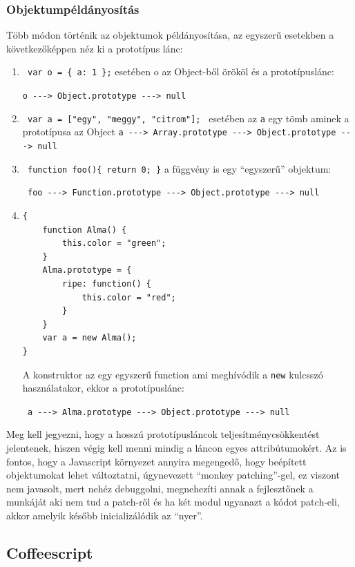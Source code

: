 \subsubsection{Objektumpéldányosítás}

Több módon történik az objektumok példányosítása, az egyszerű esetekben a következőképpen néz ki a prototípus lánc: 
\begin{enumerate}
\item \lstinline| var o = { a: 1 };| esetében o az Object-ből örököl és a prototípuslánc:

 \lstinline|o ---> Object.prototype ---> null|
\item \lstinline| var a = ["egy", "meggy", "citrom"]; | esetében az \lstinline{a} egy tömb aminek a prototípusa az Object \lstinline|a ---> Array.prototype ---> Object.prototype ---> null|
\item \lstinline| function foo(){ return 0; }| a függvény is egy ``egyszerű'' objektum: 

\lstinline| foo ---> Function.prototype ---> Object.prototype ---> null| 

\item 
\begin{lstlisting}
{
    function Alma() {
        this.color = "green";
    }
    Alma.prototype = {
        ripe: function() {
            this.color = "red";
        } 
    }
    var a = new Alma();
}
\end{lstlisting}

A konstruktor az egy egyszerű function ami meghívódik a \lstinline{new} kulcsszó használatakor, ekkor a prototípuslánc: 

\lstinline| a ---> Alma.prototype ---> Object.prototype ---> null|

\end{enumerate}

Meg kell jegyezni, hogy a hosszú prototípusláncok teljesítménycsökkentést jelentenek, hiszen végig kell menni mindig a láncon egyes attribútumokért. Az is fontos, hogy a Javascript környezet annyira megengedő, hogy beépített objektumokat lehet változtatni, úgynevezett ``monkey patching''-gel, ez viszont nem javasolt, mert nehéz debuggolni, megnehezíti annak a fejlesztőnek a munkáját aki nem tud a patch-ről és ha két modul ugyanazt a kódot patch-eli, akkor amelyik később inicializálódik az ``nyer''.



\subsection{Coffeescript}

